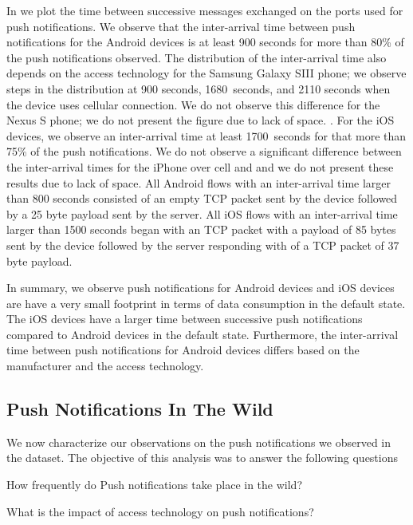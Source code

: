 In  we plot the time between successive messages exchanged on the ports used for push notifications. 
We observe that the inter-arrival time between push notifications for the Android devices is at least 900 seconds for more than 80\% of the push notifications observed. 
The distribution of the inter-arrival time also depends on the access technology for the Samsung Galaxy SIII phone; we observe steps in the distribution at 900 seconds, 1680~seconds, and 2110 seconds when the device uses cellular connection. 
We do not observe this difference for the Nexus S phone; we do not present the figure due to lack of space. 
.
For the iOS devices, we observe an inter-arrival time at least 1700~seconds for that more than 75\% of the push notifications. 
We do not observe a significant difference between the inter-arrival times for the iPhone over cell and \wifi and we do not present these results due to lack of space. 
All Android flows with an inter-arrival time larger than 800 seconds consisted of an empty TCP packet sent by the device followed by a 25 byte payload sent by the server.
All iOS flows with an inter-arrival time larger than 1500 seconds began with an TCP packet with a payload of 85 bytes sent by the device followed by the server responding with of a TCP packet of 37 byte payload.


In summary, we observe push notifications for Android devices and iOS devices are have a very small footprint in terms of data consumption in the default state.
The iOS devices have a larger time between successive push notifications compared to Android devices in the default state. 
Furthermore, the inter-arrival time between push notifications for Android devices differs based on the manufacturer and the access technology.


\subsection{Push Notifications In The Wild} 

We now characterize our observations on the push notifications we observed in the \mobWild dataset. 
The objective of this analysis was to answer the following questions
\begin{packedenumerate}
\item How frequently do Push notifications take place in the wild?
\item What is the impact of access technology on push notifications?
\item {}	
\item {}
\item {}
\end{packedenumerate}

